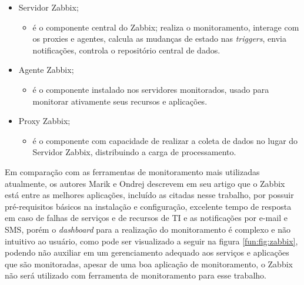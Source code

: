 \begin{itemize}
\item Servidor Zabbix;
    \begin{itemize}
        \item é o componente central do Zabbix; realiza o monitoramento, interage com os proxies e agentes, calcula as mudanças de estado nas \textit{triggers}, envia notificações, controla o repositório central de dados.
    \end{itemize}
\item Agente Zabbix;
\begin{itemize}
        \item é o componente instalado nos servidores monitorados, usado para monitorar ativamente seus recursos e aplicações.
    \end{itemize}
\item Proxy Zabbix;
\begin{itemize}
        \item é o componente com capacidade de realizar a coleta de dados no lugar do Servidor Zabbix, distribuindo a carga de processamento.
    \end{itemize}
\end{itemize}

Em comparação com as ferramentas de monitoramento mais utilizadas atualmente, os autores Marik e Ondrej \cite{marik2014comparative} descrevem em seu artigo que o Zabbix está entre as melhores aplicações, incluído as citadas nesse trabalho, por possuir pré-requisitos básicos na instalação e configuração, excelente tempo de resposta em caso de falhas de serviços e de recursos de \acrshort{TI} e as notificações por e-mail e \acrshort{SMS}, porém o \textit{dashboard} para a realização do monitoramento é complexo e não intuitivo ao usuário, como pode ser visualizado a seguir na figura \ref{fun:fig:zabbix}, podendo não auxiliar em um gerenciamento adequado aos serviços e aplicações que são monitoradas, apesar de uma boa aplicação de monitoramento, o Zabbix não será utilizado com ferramenta de monitoramento para esse trabalho.    

